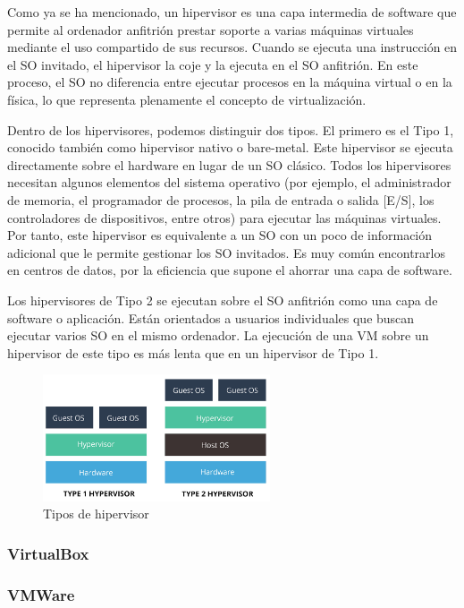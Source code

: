 Como ya se ha mencionado, un hipervisor es una capa intermedia de software que permite al ordenador anfitrión prestar soporte a varias máquinas virtuales mediante el uso compartido de sus recursos. Cuando se ejecuta una instrucción en el SO invitado, el hipervisor la coje y la ejecuta en el SO anfitrión. En este proceso, el SO no diferencia entre ejecutar procesos en la máquina virtual o en la física, lo que representa plenamente el concepto de virtualización.

Dentro de los hipervisores, podemos distinguir dos tipos. El primero es el Tipo 1, conocido también como hipervisor nativo o bare-metal. Este hipervisor se ejecuta directamente sobre el hardware en lugar de un SO clásico. Todos los hipervisores necesitan algunos elementos del sistema operativo (por ejemplo, el administrador de memoria, el programador de procesos, la pila de entrada o salida [E/S], los controladores de dispositivos, entre otros) para ejecutar las máquinas virtuales. Por tanto, este hipervisor es equivalente a un SO con un poco de información adicional que le permite gestionar los SO invitados. Es muy común encontrarlos en centros de datos, por la eficiencia que supone el ahorrar una capa de software.

Los hipervisores de Tipo 2 se ejecutan sobre el SO anfitrión como una capa de software o aplicación. Están orientados a usuarios individuales que buscan ejecutar varios SO en el mismo ordenador. La ejecución de una VM sobre un hipervisor de este tipo es más lenta que en un hipervisor de Tipo 1.

\begin{figure}[h]
\centering
\includegraphics[width=0.6\textwidth]{../imgs/EdA/hipervisor.jpg}
\caption{Tipos de hipervisor}
\label{fig:hipervtypes}
\end{figure}

\subsubsection{VirtualBox}
\subsubsection{VMWare}
